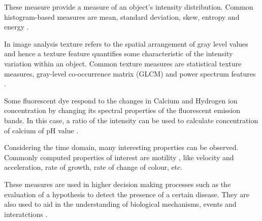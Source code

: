 \begin{definition}
	These measure provide a measure of an object's intensity distribution.
	Common histogram-based measures are mean, standard deviation, skew, entropy and energy \citep{Rust2006,Boland2001}.
\end{definition}

\begin{definition}
	In image analysis texture refers to the spatial arrangement of gray level values \citep{Duda2001} and hence a texture feature quantifies some characteristic of the intensity variation within an object.
	Common texture measures are statistical texture measures, gray-level co-occurrence matrix (GLCM) \citep{Atlamazoglou2001,Cicchi2010} and power spectrum features \citep{Erik1999,Xu1996}.
\end{definition}

\begin{definition}
	Some fluorescent dye respond to the changes in Calcium and Hydrogen ion concentration by changing its spectral properties of the fluorescent emission bands. In this case, a ratio of the intensity can be used to calculate concentration of calcium of pH value \citep{Dobrucki2013}.
\end{definition}

\begin{definition}
	Considering the time domain, many interesting properties can be observed.
	Commonly computed properties of interest are motility \citep{Sekar2003,Miller1869,Mathur2000}, like velocity and acceleration, rate of growth, rate of change of colour, etc.
\end{definition}

These measures are used in higher decision making processes such as the evaluation of a hypothesis to detect the presence of a certain disease. They are also used to aid in the understanding of biological mechanisms, events and interatctions \citep{Danek2012}.